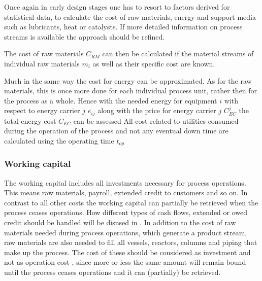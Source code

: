         Once again in early design stages one has to resort to factors derived for statistical data, to calculate
        the cost of raw materials, energy and support media such as lubricants, heat or catalysts. If more
        detailed information on process streams is available the approach should be refined.

        The cost of raw materials $C_{RM}$ can then be calculated if the material streams of individual raw materials
        $m_i$ as well as their specific cost are known.

        Much in the same way the cost for energy can be approximated. As for the raw materials, this is once
        more done for each individual process unit, rather then for the process as a whole. Hence
        with the needed energy for equipment $i$ with respect to energy carrier $j$ $e_{ij}$ along with
        the price for energy carrier $j$ $C_{EC}^j$ the total energy cost $C_{EC}$ can be assessed
        All cost related to utilities consumed during the operation of the process and not any eventual 
        down time are calculated using the operating time $t_{op}$

    \subsubsection{Working capital}
        The working capital includes all investments necessary for process operations. This means raw
        materials, payroll, extended credit to customers and so on. In contrast to all other costs the
        working capital can partially be retrieved when the process ceases operations. How different
        types of cash flows, extended or owed credit should be handled will be disused in
        . In addition to the cost of raw materials needed during process
        operations, which generate a product stream, raw materials are also needed to fill all vessels, reactors,
        columns and piping that make up the process. The cost of these should be considered as investment
        and not as operation cost \cite{Coulson.1999}, since more or less the same amount will remain bound until
        the process ceases operations and it can (partially) be retrieved.

